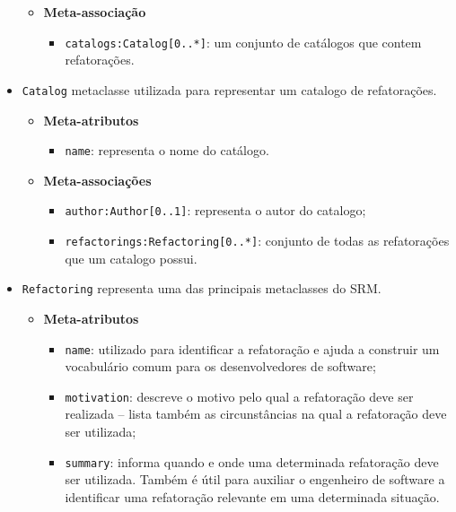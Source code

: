 \begin{itemize}
\begin{itemize}
	\item \textbf{Meta-associação}
		\begin{itemize}
			\item \texttt{catalogs:Catalog[0..*]}: um conjunto de catálogos que contem refatorações.
		\end{itemize}	
\end{itemize} 

\item \texttt{Catalog} metaclasse utilizada para representar um catalogo de refatorações.

\begin{itemize}
	\item \textbf{Meta-atributos}
		\begin{itemize}
			\item \texttt{name}: representa o nome do catálogo. 
		\end{itemize}	
\end{itemize} 

\begin{itemize}
	\item \textbf{Meta-associações}
		\begin{itemize}
			\item \texttt{author:Author[0..1]}: representa o autor do catalogo;
			\item \texttt{refactorings:Refactoring[0..*]}: conjunto de todas as refatorações que um catalogo possui.
		\end{itemize}	
\end{itemize} 

\item \texttt{Refactoring} representa uma das principais metaclasses do SRM.

\begin{itemize}
	\item \textbf{Meta-atributos}
		\begin{itemize}
			\item \texttt{name}: utilizado para identificar a refatoração e ajuda a construir um vocabulário comum para os desenvolvedores de software;
			\item \texttt{motivation}: descreve o motivo pelo qual a refatoração deve ser realizada – lista também as circunstâncias na qual a refatoração deve ser utilizada;
			\item \texttt{summary}: informa quando e onde uma determinada refatoração deve ser utilizada. Também é útil para auxiliar o engenheiro de software a identificar uma refatoração relevante em uma determinada situação. 
		\end{itemize}	
\end{itemize} 


\end{itemize}
